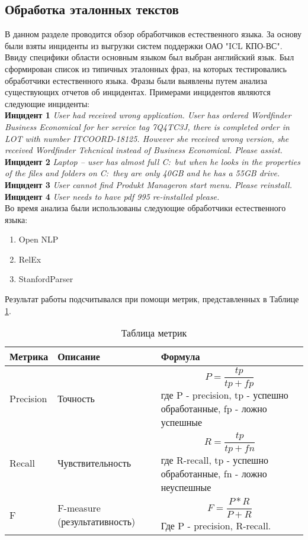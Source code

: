 \subsection{Обработка эталонных текстов} \label{sect2_1}
В данном разделе проводится обзор обработчиков естественного языка. За основу были взяты инциденты из выгрузки систем поддержки ОАО "ICL КПО-ВС". \\
Ввиду специфики области основным языком был выбран английский язык. Был сформирован список из типичных эталонных фраз, на которых тестировались обработчики естественного языка. Фразы были выявлены путем анализа существующих отчетов об инцидентах. Примерами инцидентов являются следующие инциденты:\\
\textbf{Инцидент 1}
\textit{
User had received wrong application. User has ordered Wordfinder Business Economical for her service tag 7Q4TC3J, there is completed order in LOT with number ITCOORD-18125. However she received wrong version, she received Wordfinder Tehcnical instead of Business Economical. Please assist.
}\\
\textbf{Инцидент 2}
\textit{
Laptop – user has almost full C:\ but when he looks in the properties of the files and folders on C:\ they are only 40GB and he has a 55GB drive.
}\\
\textbf{Инцидент 3}
\textit{
User cannot find Produkt Manageron start menu. Please reinstall. 
}\\
\textbf{Инцидент 4}
\textit{
User needs to have pdf 995 re-installed please.
}\\

Во время анализа были использованы следующие обработчики естественного языка:
\begin {enumerate}
	\item{Open NLP}\cite{OpenNLP}
	\item{RelEx}\cite{OpenCogRelex}
	\item{StanfordParser}\cite{StanfordParser}
\end {enumerate}

Результат работы подсчитывался при помощи метрик, представленных в Таблице \ref{Metrics}. 

\begin{table} [htbp]
  \centering
  \parbox{15cm}{\caption{Таблица метрик}\label{Metrics}}
  \begin{tabular}{| p{5cm} ||p{5cm}|| p{5cm} |}
  \hline
  \hline
Метрика & Описание & Формула \\
  \hline
  \hline
Precision	& Точность & 
$$ 
P=\frac{tp}{tp+fp}
$$ где P - precision, tp -  успешно обработанные, fp - ложно успешные \\
 \hline
Recall	& Чувствительность & 
$$ 
R=\frac{tp}{tp+fn}
$$ где R-recall, tp - успешно обработанные, fn - ложно неуспешные \\
 \hline
F	& F-measure (результативность) & 
$$ 
F=\frac{P*R}{P+R}
$$ Где P - precision, R-recall.   \\
 \hline
  \end{tabular}
\end{table}

